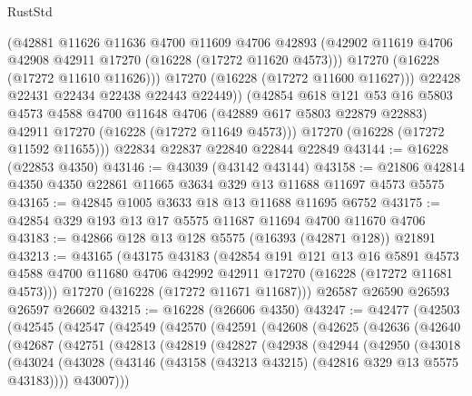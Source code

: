 \begin{lexlean}{RustStd}
\begin{coremodule}
            (@42881
              @11626
              @11636
              @4700
              @11609
              @4706
              @42893
              (@42902 @11619 @4706 @42908 @42911 @17270 (@16228 (@17272 @11620 @4573)))
              @17270
              (@16228 (@17272 @11610 @11626)))
            @17270
            (@16228 (@17272 @11600 @11627)))
          @22428
          @22431
          @22434
          @22438
          @22443
          @22449))
      (@42854
        @618
        @121
        @53
        @16
        @5803
        @4573
        @4588
        @4700
        @11648
        @4706
        (@42889 @617 @5803 @22879 @22883)
        @42911
        @17270
        (@16228 (@17272 @11649 @4573)))
      @17270
      (@16228 (@17272 @11592 @11655)))
    @22834
    @22837
    @22840
    @22844
    @22849
@43144 := @16228 (@22853 @4350)
@43146 := @43039 (@43142 @43144)
@43158 := @21806 @42814 @4350 @4350 @22861 @11665 @3634 @329 @13 @11688 @11697 @4573 @5575
@43165 := @42845 @1005 @3633 @18 @13 @11688 @11695 @6752
@43175 := @42854 @329 @193 @13 @17 @5575 @11687 @11694 @4700 @11670 @4706
@43183 := @42866 @128 @13 @128 @5575 (@16393 (@42871 @128)) @21891
@43213 := @43165
    (@43175
      @43183
      (@42854
        @191
        @121
        @13
        @16
        @5891
        @4573
        @4588
        @4700
        @11680
        @4706
        @42992
        @42911
        @17270
        (@16228 (@17272 @11681 @4573)))
      @17270
      (@16228 (@17272 @11671 @11687)))
    @26587
    @26590
    @26593
    @26597
    @26602
@43215 := @16228 (@26606 @4350)
@43247 := @42477
    (@42503
      (@42545
        (@42547
          (@42549
            (@42570
              (@42591
                (@42608
                  (@42625
                    (@42636
                      (@42640
                        (@42687
                          (@42751
                            (@42813
                              (@42819
                                (@42827
                                  (@42938
                                    (@42944
                                      (@42950
                                        (@43018
                                          (@43024
                                            (@43028
                                              (@43146
                                                (@43158
                                                  (@43213 @43215)
                                                  (@42816 @329 @13 @5575 @43183))))
                                            @43007)))

\end{coremodule}
\end{lexlean}
